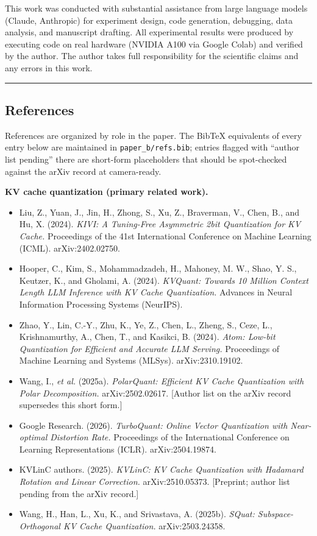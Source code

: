 \documentclass[
]{article}
\providecommand{\tightlist}{%
  \setlength{\itemsep}{0pt}\setlength{\parskip}{0pt}}
\begin{document}
This work was conducted with substantial assistance from large language
models (Claude, Anthropic) for experiment design, code generation,
debugging, data analysis, and manuscript drafting. All experimental
results were produced by executing code on real hardware (NVIDIA A100
via Google Colab) and verified by the author. The author takes full
responsibility for the scientific claims and any errors in this work.

\begin{center}\rule{0.5\linewidth}{0.5pt}\end{center}

\subsection{References}\label{references}

References are organized by role in the paper. The BibTeX equivalents of
every entry below are maintained in \texttt{paper\_b/refs.bib}; entries
flagged with ``author list pending'' there are short-form placeholders
that should be spot-checked against the arXiv record at camera-ready.

\textbf{KV cache quantization (primary related work).}

\begin{itemize}
\tightlist
\item
  Liu, Z., Yuan, J., Jin, H., Zhong, S., Xu, Z., Braverman, V., Chen,
  B., and Hu, X. (2024). \emph{KIVI: A Tuning-Free Asymmetric 2bit
  Quantization for KV Cache.} Proceedings of the 41st International
  Conference on Machine Learning (ICML). arXiv:2402.02750.
\item
  Hooper, C., Kim, S., Mohammadzadeh, H., Mahoney, M. W., Shao, Y. S.,
  Keutzer, K., and Gholami, A. (2024). \emph{KVQuant: Towards 10 Million
  Context Length LLM Inference with KV Cache Quantization.} Advances in
  Neural Information Processing Systems (NeurIPS).
\item
  Zhao, Y., Lin, C.-Y., Zhu, K., Ye, Z., Chen, L., Zheng, S., Ceze, L.,
  Krishnamurthy, A., Chen, T., and Kasikci, B. (2024). \emph{Atom:
  Low-bit Quantization for Efficient and Accurate LLM Serving.}
  Proceedings of Machine Learning and Systems (MLSys). arXiv:2310.19102.
\item
  Wang, I., \emph{et al.} (2025a). \emph{PolarQuant: Efficient KV Cache
  Quantization with Polar Decomposition.} arXiv:2502.02617. {[}Author
  list on the arXiv record supersedes this short form.{]}
\item
  Google Research. (2026). \emph{TurboQuant: Online Vector Quantization
  with Near-optimal Distortion Rate.} Proceedings of the International
  Conference on Learning Representations (ICLR). arXiv:2504.19874.
\item
  KVLinC authors. (2025). \emph{KVLinC: KV Cache Quantization with
  Hadamard Rotation and Linear Correction.} arXiv:2510.05373.
  {[}Preprint; author list pending from the arXiv record.{]}
\item
  Wang, H., Han, L., Xu, K., and Srivastava, A. (2025b). \emph{SQuat:
  Subspace-Orthogonal KV Cache Quantization.} arXiv:2503.24358.
\end{itemize}
\end{document}
